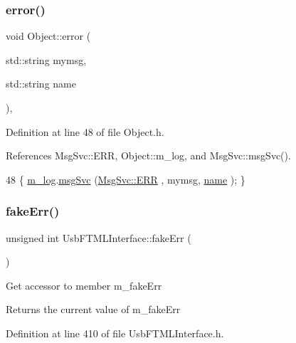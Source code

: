 \subsubsection{\texorpdfstring{error()}{error()}\hspace{0.1cm}{\footnotesize\ttfamily [2/2]}}
{\footnotesize\ttfamily void Object\+::error (\begin{DoxyParamCaption}\item[{std\+::string}]{mymsg,  }\item[{std\+::string}]{name }\end{DoxyParamCaption})\hspace{0.3cm}{\ttfamily [inline]}, {\ttfamily [inherited]}}



Definition at line 48 of file Object.\+h.



References Msg\+Svc\+::\+E\+RR, Object\+::m\+\_\+log, and Msg\+Svc\+::msg\+Svc().


\begin{DoxyCode}
48 \{ \hyperlink{classObject_a0d269813dd7ac1f24bc143031e2963f2}{m\_log}.\hyperlink{classMsgSvc_ad25f18047920cc59a314e5098259711c}{msgSvc} (\hyperlink{classMsgSvc_ae671eb7301996cd049d2da8a65925926a35a9d7166e9896af4ec8fb33bf5f1772}{MsgSvc::ERR}     , mymsg, \hyperlink{classObject_a300f4c05dd468c7bb8b3c968868443c1}{name} ); \}
\end{DoxyCode}
\mbox{\label{classUsbFTMLInterface_a0379dd75800521cea37580d68205f620}} 
\subsubsection{\texorpdfstring{fake\+Err()}{fakeErr()}}
{\footnotesize\ttfamily unsigned int Usb\+F\+T\+M\+L\+Interface\+::fake\+Err (\begin{DoxyParamCaption}{ }\end{DoxyParamCaption})\hspace{0.3cm}{\ttfamily [inline]}}

Get accessor to member m\+\_\+fake\+Err \begin{DoxyReturn}{Returns}
the current value of m\+\_\+fake\+Err 
\end{DoxyReturn}


Definition at line 410 of file Usb\+F\+T\+M\+L\+Interface.\+h.



